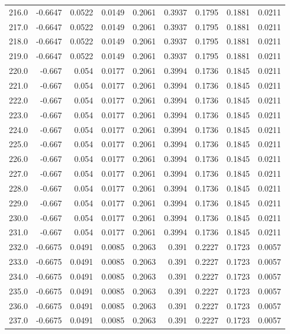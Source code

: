 \begin{longtable}{lrrrrrrrr}
216.0 & -0.6647 & 0.0522 & 0.0149 & 0.2061 & 0.3937 & 0.1795 & 0.1881 & 0.0211 \\
217.0 & -0.6647 & 0.0522 & 0.0149 & 0.2061 & 0.3937 & 0.1795 & 0.1881 & 0.0211 \\
218.0 & -0.6647 & 0.0522 & 0.0149 & 0.2061 & 0.3937 & 0.1795 & 0.1881 & 0.0211 \\
219.0 & -0.6647 & 0.0522 & 0.0149 & 0.2061 & 0.3937 & 0.1795 & 0.1881 & 0.0211 \\
220.0 & -0.667 & 0.054 & 0.0177 & 0.2061 & 0.3994 & 0.1736 & 0.1845 & 0.0211 \\
221.0 & -0.667 & 0.054 & 0.0177 & 0.2061 & 0.3994 & 0.1736 & 0.1845 & 0.0211 \\
222.0 & -0.667 & 0.054 & 0.0177 & 0.2061 & 0.3994 & 0.1736 & 0.1845 & 0.0211 \\
223.0 & -0.667 & 0.054 & 0.0177 & 0.2061 & 0.3994 & 0.1736 & 0.1845 & 0.0211 \\
224.0 & -0.667 & 0.054 & 0.0177 & 0.2061 & 0.3994 & 0.1736 & 0.1845 & 0.0211 \\
225.0 & -0.667 & 0.054 & 0.0177 & 0.2061 & 0.3994 & 0.1736 & 0.1845 & 0.0211 \\
226.0 & -0.667 & 0.054 & 0.0177 & 0.2061 & 0.3994 & 0.1736 & 0.1845 & 0.0211 \\
227.0 & -0.667 & 0.054 & 0.0177 & 0.2061 & 0.3994 & 0.1736 & 0.1845 & 0.0211 \\
228.0 & -0.667 & 0.054 & 0.0177 & 0.2061 & 0.3994 & 0.1736 & 0.1845 & 0.0211 \\
229.0 & -0.667 & 0.054 & 0.0177 & 0.2061 & 0.3994 & 0.1736 & 0.1845 & 0.0211 \\
230.0 & -0.667 & 0.054 & 0.0177 & 0.2061 & 0.3994 & 0.1736 & 0.1845 & 0.0211 \\
231.0 & -0.667 & 0.054 & 0.0177 & 0.2061 & 0.3994 & 0.1736 & 0.1845 & 0.0211 \\
232.0 & -0.6675 & 0.0491 & 0.0085 & 0.2063 & 0.391 & 0.2227 & 0.1723 & 0.0057 \\
233.0 & -0.6675 & 0.0491 & 0.0085 & 0.2063 & 0.391 & 0.2227 & 0.1723 & 0.0057 \\
234.0 & -0.6675 & 0.0491 & 0.0085 & 0.2063 & 0.391 & 0.2227 & 0.1723 & 0.0057 \\
235.0 & -0.6675 & 0.0491 & 0.0085 & 0.2063 & 0.391 & 0.2227 & 0.1723 & 0.0057 \\
236.0 & -0.6675 & 0.0491 & 0.0085 & 0.2063 & 0.391 & 0.2227 & 0.1723 & 0.0057 \\
237.0 & -0.6675 & 0.0491 & 0.0085 & 0.2063 & 0.391 & 0.2227 & 0.1723 & 0.0057 \\

\end{longtable}
